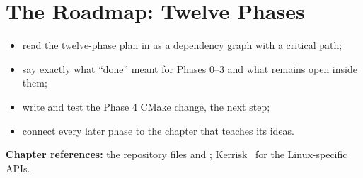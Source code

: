 \chapter{The Roadmap: Twelve Phases}\label{ch:roadmap}

\begin{objectives}
\begin{itemize}
\item read the twelve-phase plan in  as a dependency graph with a critical path;
\item say exactly what ``done'' meant for Phases 0--3 and what remains open inside them;
\item write and test the Phase 4 CMake change, the next step;
\item connect every later phase to the chapter that teaches its ideas.
\end{itemize}
{\small\color{muted}\textbf{Chapter references:} the repository files  and ; Kerrisk~\cite{kerrisk2010tlpi} for the Linux-specific APIs.}
\end{objectives}

